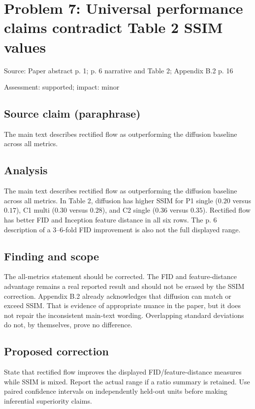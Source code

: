 \documentclass[11pt]{article}
\begin{document}
\section*{Problem 7: Universal performance claims contradict Table 2 SSIM values}

Source: Paper abstract p. 1; p. 6 narrative and Table 2; Appendix B.2 p. 16

Assessment: supported; impact: minor

\subsection*{Source claim (paraphrase)}

The main text describes rectified flow as outperforming the diffusion baseline across all metrics.

\subsection*{Analysis}

The main text describes rectified flow as outperforming the diffusion baseline across all metrics. In Table 2, diffusion has higher SSIM for P1 single (\(0.20\) versus \(0.17\)), C1 multi (\(0.30\) versus \(0.28\)), and C2 single (\(0.36\) versus \(0.35\)). Rectified flow has better FID and Inception feature distance in all six rows. The p. 6 description of a \(3\)–\(6\)-fold FID improvement is also not the full displayed range.

\subsection*{Finding and scope}

The all-metrics statement should be corrected. The FID and feature-distance advantage remains a real reported result and should not be erased by the SSIM correction. Appendix B.2 already acknowledges that diffusion can match or exceed SSIM. That is evidence of appropriate nuance in the paper, but it does not repair the inconsistent main-text wording. Overlapping standard deviations do not, by themselves, prove no difference.

\subsection*{Proposed correction}

State that rectified flow improves the displayed FID/feature-distance measures while SSIM is mixed. Report the actual range if a ratio summary is retained. Use paired confidence intervals on independently held-out units before making inferential superiority claims.
\end{document}
